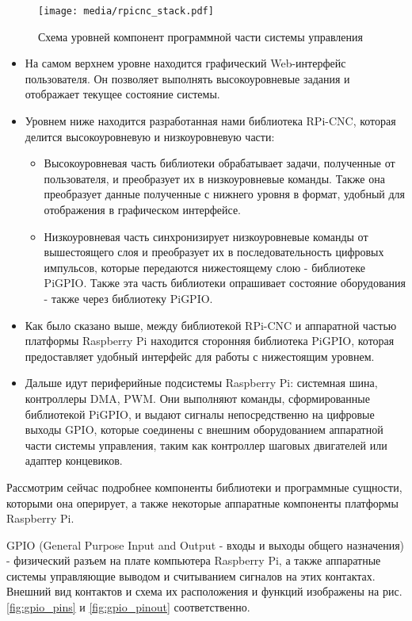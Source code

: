 \documentclass[14pt,russian,a4paper]{extarticle}
\newcounter{subsubsubsection}[subsubsection]
\begin{document}
\begin{figure}[h!]
    \centerline{\texttt{[image: media/rpicnc\_stack.pdf]}}
    \caption{Схема уровней компонент программной части системы управления}
    \label{fig:rpicnc_stack}
\end{figure}

\begin{itemize}
    \item На самом верхнем уровне находится графический Web-интерфейс пользователя. Он позволяет выполнять высокоуровневые задания и отображает текущее состояние системы.
    \item Уровнем ниже находится разработанная нами библиотека RPi-CNC, которая делится высокоуровневую и низкоуровневую части:
    \begin{itemize}
        \item Высокоуровневая часть библиотеки обрабатывает задачи, полученные от пользователя, и преобразует их в низкоуровневые команды. Также она преобразует данные полученные с нижнего уровня в формат, удобный для отображения в графическом интерфейсе.
        \item Низкоуровневая часть синхронизирует низкоуровневые команды от вышестоящего слоя и преобразует их в последовательность цифровых импульсов, которые передаются нижестоящему слою - библиотеке PiGPIO. Также эта часть библиотеки опрашивает состояние оборудования - также через библиотеку PiGPIO.
    \end{itemize}
    \item Как было сказано выше, между библиотекой RPi-CNC и аппаратной частью платформы Raspberry Pi находится сторонняя библиотека PiGPIO, которая предоставляет удобный интерфейс для работы с нижестоящим уровнем.
    \item Дальше идут периферийные подсистемы Raspberry Pi: системная шина, контроллеры DMA, PWM. Они выполняют команды, сформированные библиотекой PiGPIO, и выдают сигналы непосредственно на цифровые выходы GPIO, которые соединены с внешним оборудованием аппаратной части системы управления, таким как контроллер шаговых двигателей или адаптер концевиков.
\end{itemize}
Рассмотрим сейчас подробнее компоненты библиотеки и программные сущности, которыми она оперирует, а также некоторые аппаратные компоненты платформы Raspberry Pi.

GPIO (General Purpose Input and Output - входы и выходы общего назначения) - физический  разъем на плате компьютера Raspberry Pi, а также аппаратные системы управляющие выводом и считыванием сигналов на этих контактах. Внешний вид контактов и схема их расположения и функций изображены на рис. \ref{fig:gpio_pins} и \ref{fig:gpio_pinout} соответственно.
\newline
\end{document}
